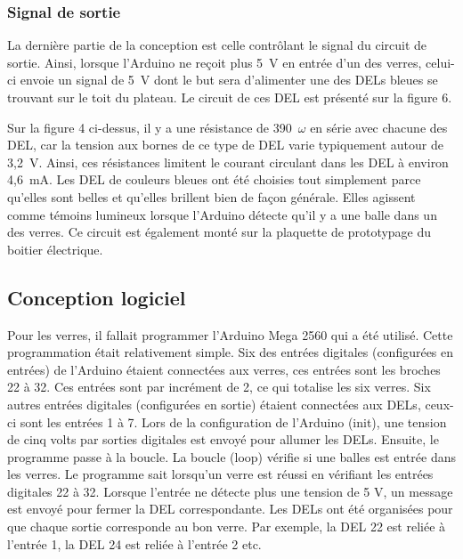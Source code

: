\subsubsection{Signal de sortie}

La dernière partie de la conception est celle contrôlant le signal du circuit de sortie.
Ainsi, lorsque l’Arduino ne reçoit plus 5~V en entrée d’un des verres, celui-ci envoie un signal de 5~V dont le but sera d’alimenter une des DELs bleues se trouvant sur le toit du plateau.
Le circuit de ces DEL est présenté sur la figure 6.


Sur la figure 4 ci-dessus, il y a une résistance de 390~$\omega$ en série avec chacune des DEL, car la tension aux bornes de ce type de DEL varie typiquement autour de 3,2~V.
Ainsi, ces résistances limitent le courant circulant dans les DEL à environ 4,6~mA.
Les DEL de couleurs bleues ont été choisies tout simplement parce qu’elles sont belles et qu’elles brillent bien de façon générale.
Elles agissent comme témoins lumineux lorsque l’Arduino détecte qu’il y a une balle dans un des verres.
Ce circuit est également monté sur la plaquette de prototypage du boitier électrique.

\subsection{Conception logiciel}



Pour les verres, il fallait programmer l'Arduino Mega 2560 qui a été utilisé.
Cette programmation était relativement simple.
Six des entrées digitales (configurées en entrées) de l'Arduino étaient connectées aux verres, ces entrées sont les broches 22 à 32.
Ces entrées sont par incrément de 2, ce qui totalise les six verres.
Six autres entrées digitales (configurées en sortie) étaient connectées aux DELs, ceux-ci sont les entrées 1 à 7.
Lors de la configuration de l'Arduino (init), une tension de cinq volts par sorties digitales est envoyé pour allumer les DELs.
Ensuite, le programme passe à la boucle.
La boucle (loop) vérifie si une balles est entrée dans les verres.
Le programme sait lorsqu'un verre est réussi en vérifiant les entrées digitales 22 à 32.
Lorsque l'entrée ne détecte plus une tension de 5 V, un message est envoyé pour fermer la DEL correspondante.
Les DELs ont été organisées pour que chaque sortie corresponde au bon verre.
Par exemple, la DEL 22 est reliée à l’entrée 1, la DEL 24 est reliée à l’entrée 2 etc.

